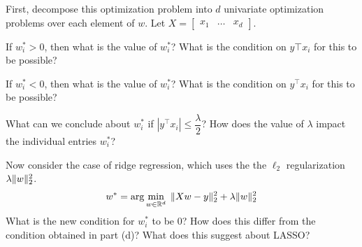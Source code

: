 \begin{enumerate}
 First, decompose this optimization problem into $d$ univariate optimization problems over each element of $w$. Let $X = \begin{bmatrix}x_1 & \ldots & x_d\end{bmatrix}$.

\newline
\sol{}
\newline

 If $w_i^* > 0$, then what is the value of $w_i^*$? What is the condition on $y\top x_i$ for this to be possible?

\newline
\sol{}
\newline

 If $w_i^* < 0$, then what is the value of $w_i^*$? What is the condition on $y^\top x_i$ for this to be possible?

\newline
\sol{}
\newline

 What can we conclude about $w_i^*$ if $|y^\top x_i| \leq \dfrac{\lambda}{2}$? How does the value of $\lambda$ impact the individual entries $w_i^*$?

\newline
\sol{}
\newline

 Now consider the case of ridge regression, which uses the the $\ell_2$ regularization $\lambda \|w\|_2^2$.
\[w^* = \arg \min_{w \in \mathbb{R}^{d}} \; \|X w - y\|_2^2 + \lambda \|w\|_2^2\]
What is the new condition for $w_i^*$ to be $0$? How does this differ from the condition obtained in part (d)? What does this suggest about LASSO?

\newline
\sol{}
\newline

\end{enumerate}
